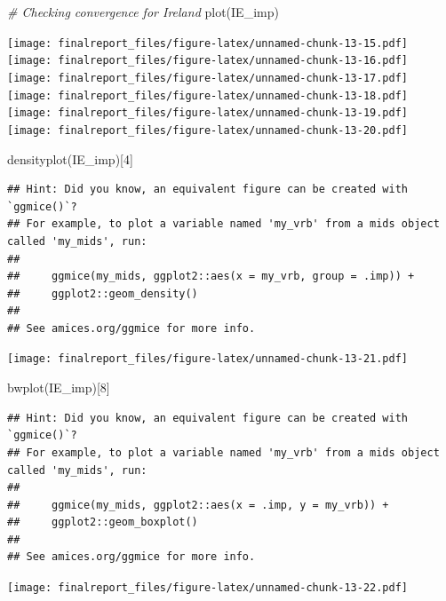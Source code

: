 \documentclass[
]{article}
\newenvironment{Shaded}{\begin{snugshade}}{\end{snugshade}}
\newcommand{\CommentTok}[1]{\textcolor[rgb]{0.56,0.35,0.01}{\textit{#1}}}
\newcommand{\DecValTok}[1]{\textcolor[rgb]{0.00,0.00,0.81}{#1}}
\newcommand{\FunctionTok}[1]{\textcolor[rgb]{0.00,0.00,0.00}{#1}}
\newcommand{\NormalTok}[1]{#1}
\begin{document}
\begin{Shaded}
\begin{Highlighting}[]
\CommentTok{\# Checking convergence for Ireland}
\FunctionTok{plot}\NormalTok{(IE\_imp)}
\end{Highlighting}
\end{Shaded}

\texttt{[image: finalreport\_files/figure-latex/unnamed-chunk-13-15.pdf]}
\texttt{[image: finalreport\_files/figure-latex/unnamed-chunk-13-16.pdf]}
\texttt{[image: finalreport\_files/figure-latex/unnamed-chunk-13-17.pdf]}
\texttt{[image: finalreport\_files/figure-latex/unnamed-chunk-13-18.pdf]}
\texttt{[image: finalreport\_files/figure-latex/unnamed-chunk-13-19.pdf]}
\texttt{[image: finalreport\_files/figure-latex/unnamed-chunk-13-20.pdf]}

\begin{Shaded}
\begin{Highlighting}[]
\FunctionTok{densityplot}\NormalTok{(IE\_imp)[}\DecValTok{4}\NormalTok{]}
\end{Highlighting}
\end{Shaded}

\begin{verbatim}
## Hint: Did you know, an equivalent figure can be created with `ggmice()`?
## For example, to plot a variable named 'my_vrb' from a mids object called 'my_mids', run: 
## 
##     ggmice(my_mids, ggplot2::aes(x = my_vrb, group = .imp)) +
##     ggplot2::geom_density() 
## 
## See amices.org/ggmice for more info.
\end{verbatim}

\texttt{[image: finalreport\_files/figure-latex/unnamed-chunk-13-21.pdf]}

\begin{Shaded}
\begin{Highlighting}[]
\FunctionTok{bwplot}\NormalTok{(IE\_imp)[}\DecValTok{8}\NormalTok{]}
\end{Highlighting}
\end{Shaded}

\begin{verbatim}
## Hint: Did you know, an equivalent figure can be created with `ggmice()`?
## For example, to plot a variable named 'my_vrb' from a mids object called 'my_mids', run: 
## 
##     ggmice(my_mids, ggplot2::aes(x = .imp, y = my_vrb)) +
##     ggplot2::geom_boxplot() 
## 
## See amices.org/ggmice for more info.
\end{verbatim}

\texttt{[image: finalreport\_files/figure-latex/unnamed-chunk-13-22.pdf]}
\end{document}
